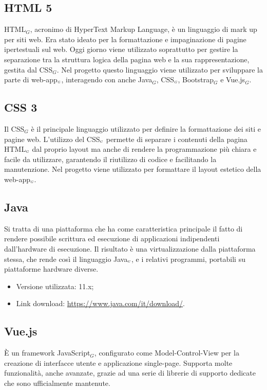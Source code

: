 \subsection{HTML 5}\label{TecnologieHTML}
HTML$_G$, acronimo di HyperText Markup Language, è un linguaggio di mark up per siti web.
Era stato ideato per la formattazione e impaginazione di pagine ipertestuali sul web.
Oggi giorno viene utilizzato soprattutto per gestire la separazione tra la struttura logica della pagina web e la sua rappresentazione, gestita dal CSS$_G$.
Nel progetto questo linguaggio viene utilizzato per sviluppare la parte di web-app$_{\scaleto{G}{3pt}}$, interagendo con anche Java$_G$, CSS$_{\scaleto{G}{3pt}}$, Bootstrap$_G$ e Vue.js$_G$.


\subsection{CSS 3}\label{TecnologieCSS}
Il CSS$_G$ è il principale linguaggio utilizzato per definire la formattazione dei siti e pagine web.
L'utilizzo del CSS$_{\scaleto{G}{3pt}}$ permette di separare i contenuti della pagina HTML$_{\scaleto{G}{3pt}}$ dal proprio layout ma anche di rendere la programmazione più chiara e facile da utilizzare, garantendo il riutilizzo di codice e facilitando la manutenzione.
Nel progetto viene utilizzato per formattare il layout estetico della web-app$_{\scaleto{G}{3pt}}$.


\subsection{Java}\label{TecnologieJava}
Si tratta di una piattaforma che ha come caratteristica principale il fatto di rendere possibile scrittura ed esecuzione di applicazioni indipendenti dall'hardware di esecuzione.
Il risultato è una virtualizzazione dalla piattaforma stessa, che rende così il linguaggio Java$_{\scaleto{G}{3pt}}$, e i relativi programmi, portabili su piattaforme hardware diverse.

\begin{itemize}
  \item Versione utilizzata: 11.x;
  \item Link download: \url{https://www.java.com/it/download/}.
\end{itemize}

\subsection{Vue.js}\label{TecnologieVue}
È un framework JavaScript$_G$, configurato come Model-Control-View per la creazione di interfacce utente e applicazione single-page.
Supporta molte funzionalità, anche avanzate, grazie ad una serie di librerie di supporto dedicate che sono ufficialmente mantenute.

